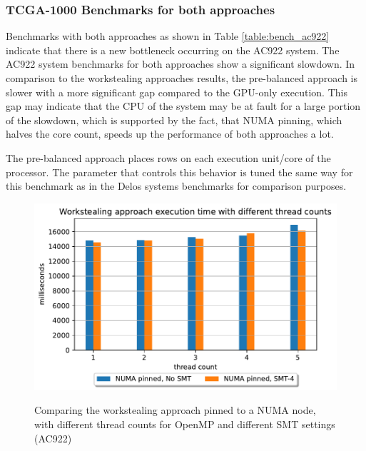 \subsubsection{TCGA-1000 Benchmarks for both approaches}


Benchmarks with both approaches as shown in Table \ref{table:bench_ac922} indicate that there is a new bottleneck occurring on the AC922 system. The AC922 system benchmarks for both approaches show a significant slowdown. In comparison to the workstealing approaches results, the pre-balanced approach is slower with a more significant gap compared to the GPU-only execution. This gap may indicate that the CPU of the system may be at fault for a large portion of the slowdown, which is supported by the fact, that NUMA pinning, which halves the core count, speeds up the performance of both approaches a lot.

The pre-balanced approach places rows on each execution unit/core of the processor. The parameter that controls this behavior is tuned the same way for this benchmark as in the Delos systems benchmarks for comparison purposes.


\begin{figure}[H]
  \caption{Comparing the workstealing approach pinned to a NUMA node, with different thread counts for OpenMP and different SMT settings (AC922)}
  \includegraphics[width=\textwidth]{figures/ac922_threadcount.pdf}
  \centering
  \label{fig:threadcount_ac922}
\end{figure}

